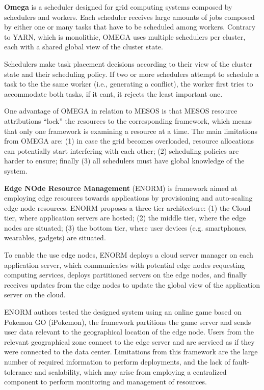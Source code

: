 \textbf{Omega} \cite{41684} is a scheduler designed for grid computing systems composed by schedulers and workers. Each scheduler receives large amounts of jobs composed by either one or many tasks that have to be scheduled among workers. Contrary to YARN, which is monolithic, OMEGA uses multiple schedulers per cluster, each with a shared global view of the cluster state.

Schedulers make task placement decisions according to their view of the cluster state and their scheduling policy. If two or more schedulers attempt to schedule a task to the the same worker (i.e., generating a conflict), the worker first tries to accommodate both tasks, if it cant, it rejects the least important one.

One advantage of OMEGA in relation to MESOS is that MESOS resource attributions ``lock'' the resources to the corresponding framework,  which means that only one framework is examining a resource at a time. The main limitations from OMEGA are: (1) in case the grid becomes overloaded, resource allocations can potentially start interfering with each other; (2) scheduling policies are harder to ensure; finally (3) all schedulers must have global knowledge of the system.

\textbf{Edge NOde Resource Management} \cite{wang2017enorm} (ENORM) is framework aimed at employing edge resources towards applications by provisioning and auto-scaling edge node resources. ENORM proposes a three-tier architecture: (1) the Cloud tier, where application servers are hosted; (2) the middle tier, where the edge nodes are situated; (3) the bottom tier, where user devices (e.g. smartphones, wearables, gadgets) are situated.

To enable the use edge nodes, ENORM deploys a cloud server manager on each application server, which communicates with potential edge nodes requesting computing services, deploys partitioned servers on the edge nodes, and finally receives updates from the edge nodes to update the global view of the application server on the cloud.

ENORM authors tested the designed system using an online game based on Pokemon GO (iPokemon)\cite{pokemonGo}, the framework partitions the game server and sends user data relevant to the geographical location of the edge node. Users from the relevant geographical zone connect to the edge server and are serviced as if they were connected to the data center. Limitations from this framework are the large number of required information to perform deployments, and the lack of fault-tolerance and scalability, which may arise from employing a centralized component to perform monitoring and management of resources.

